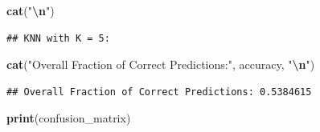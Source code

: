 \documentclass[
]{article}
\newenvironment{Shaded}{\begin{snugshade}}{\end{snugshade}}
\newcommand{\AttributeTok}[1]{\textcolor[rgb]{0.13,0.29,0.53}{#1}}
\newcommand{\CommentTok}[1]{\textcolor[rgb]{0.56,0.35,0.01}{\textit{#1}}}
\newcommand{\DecValTok}[1]{\textcolor[rgb]{0.00,0.00,0.81}{#1}}
\newcommand{\FunctionTok}[1]{\textcolor[rgb]{0.13,0.29,0.53}{\textbf{#1}}}
\newcommand{\NormalTok}[1]{#1}
\newcommand{\OtherTok}[1]{\textcolor[rgb]{0.56,0.35,0.01}{#1}}
\newcommand{\SpecialCharTok}[1]{\textcolor[rgb]{0.81,0.36,0.00}{\textbf{#1}}}
\newcommand{\StringTok}[1]{\textcolor[rgb]{0.31,0.60,0.02}{#1}}
\begin{document}
\begin{Shaded}
\begin{Highlighting}[]
\FunctionTok{cat}\NormalTok{(}\StringTok{"}\SpecialCharTok{\textbackslash{}n}\StringTok{"}\NormalTok{)}
\end{Highlighting}
\end{Shaded}

\begin{Shaded}
\end{Shaded}

\begin{verbatim}
## KNN with K = 5:
\end{verbatim}

\begin{Shaded}
\begin{Highlighting}[]
\FunctionTok{cat}\NormalTok{(}\StringTok{"Overall Fraction of Correct Predictions:"}\NormalTok{, accuracy, }\StringTok{"}\SpecialCharTok{\textbackslash{}n}\StringTok{"}\NormalTok{)}
\end{Highlighting}
\end{Shaded}

\begin{verbatim}
## Overall Fraction of Correct Predictions: 0.5384615
\end{verbatim}

\begin{Shaded}
\begin{Highlighting}[]
\FunctionTok{print}\NormalTok{(confusion\_matrix)}
\end{Highlighting}
\end{Shaded}
\end{document}
